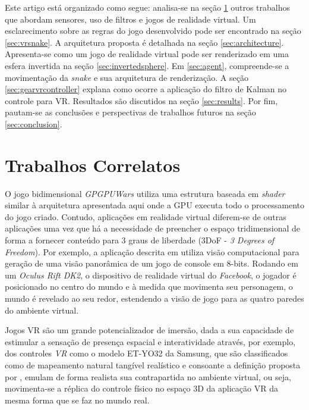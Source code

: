 \documentclass{vgtc}                          %
\begin{document}
Este artigo está organizado como segue: analisa-se na seção \ref{sec:relatedworks} outros trabalhos que abordam sensores, uso de filtros e jogos de realidade virtual. Um esclarecimento sobre as regras do jogo desenvolvido pode ser encontrado na seção \ref{sec:vrsnake}. A arquitetura proposta é detalhada na seção \ref{sec:architecture}. Apresenta-se como um jogo de realidade virtual pode ser renderizado em uma esfera invertida na seção \ref{sec:invertedsphere}. Em \ref{sec:agent}, compreende-se a movimentação da \textit{snake} e sua arquitetura de renderização. A seção \ref{sec:gearvrcontroller} explana como ocorre a aplicação do filtro de Kalman no controle para VR. Resultados são discutidos na seção \ref{sec:results}. Por fim, pautam-se as conclusões e perspectivas de trabalhos futuros na seção \ref{sec:conclusion}.

\section{Trabalhos Correlatos} \label{sec:relatedworks}
O jogo bidimensional \textit{GPGPUWars} \cite{GPGPUWars} utiliza uma estrutura baseada em \textit{shader} similar à arquitetura apresentada aqui onde a GPU executa todo o processamento do jogo criado. Contudo, aplicações em realidade virtual diferem-se de outras aplicações uma vez que há a necessidade de preencher o espaço tridimensional de forma a fornecer conteúdo para 3 graus de liberdade (3DoF - \textit{3 Degrees of Freedom}). Por exemplo, a aplicação descrita em \cite{zund2015unfolding} utiliza visão computacional para geração de uma visão panorâmica de um jogo de console em 8-bits. Rodando em um \textit{Oculus Rift DK2}, o dispositivo de realidade virtual do \textit{Facebook}, o jogador é posicionado no centro do mundo e à medida que movimenta seu personagem, o mundo é revelado ao seu redor, estendendo a visão de jogo para as quatro paredes do ambiente virtual.

Jogos VR são um grande potencializador de imersão, dada a sua capacidade de estimular a sensação de presença espacial e interatividade \cite{seibert2017control} através, por exemplo, dos controles \textit{VR} como o modelo ET-YO32 da Samsung, que são classificados como de mapeamento natural tangível realístico e consoante a definição proposta por \cite{skalski2011mapping}, emulam de forma realista sua contrapartida no ambiente virtual, ou seja, movimenta-se a réplica do controle físico no espaço 3D da aplicação VR da mesma forma que se faz no mundo real.
\end{document}

